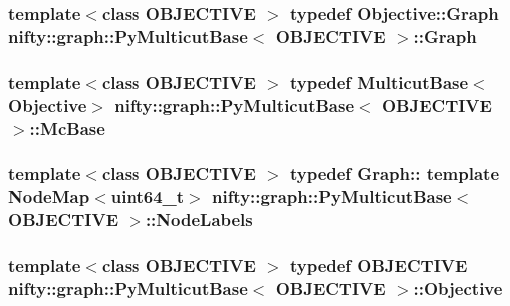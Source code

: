 \subsubsection[{Graph}]{\setlength{\rightskip}{0pt plus 5cm}template$<$class O\+B\+J\+E\+C\+T\+I\+V\+E $>$ typedef Objective\+::\+Graph {\bf nifty\+::graph\+::\+Py\+Multicut\+Base}$<$ O\+B\+J\+E\+C\+T\+I\+V\+E $>$\+::{\bf Graph}}\label{classnifty_1_1graph_1_1PyMulticutBase_adcef0a06c28d00ad248e6118b96c3630}
\hypertarget{classnifty_1_1graph_1_1PyMulticutBase_a687613abe29ca84ad5dc24e7bb072b83}{}
\subsubsection[{Mc\+Base}]{\setlength{\rightskip}{0pt plus 5cm}template$<$class O\+B\+J\+E\+C\+T\+I\+V\+E $>$ typedef {\bf Multicut\+Base}$<${\bf Objective}$>$ {\bf nifty\+::graph\+::\+Py\+Multicut\+Base}$<$ O\+B\+J\+E\+C\+T\+I\+V\+E $>$\+::{\bf Mc\+Base}}\label{classnifty_1_1graph_1_1PyMulticutBase_a687613abe29ca84ad5dc24e7bb072b83}
\hypertarget{classnifty_1_1graph_1_1PyMulticutBase_af4707ea886ac9eefe9f755a4977a4eb0}{}
\subsubsection[{Node\+Labels}]{\setlength{\rightskip}{0pt plus 5cm}template$<$class O\+B\+J\+E\+C\+T\+I\+V\+E $>$ typedef Graph\+:: template Node\+Map$<$uint64\+\_\+t$>$ {\bf nifty\+::graph\+::\+Py\+Multicut\+Base}$<$ O\+B\+J\+E\+C\+T\+I\+V\+E $>$\+::{\bf Node\+Labels}}\label{classnifty_1_1graph_1_1PyMulticutBase_af4707ea886ac9eefe9f755a4977a4eb0}
\hypertarget{classnifty_1_1graph_1_1PyMulticutBase_ab2111d845c2163c0a7a4d9cccbe18458}{}
\subsubsection[{Objective}]{\setlength{\rightskip}{0pt plus 5cm}template$<$class O\+B\+J\+E\+C\+T\+I\+V\+E $>$ typedef O\+B\+J\+E\+C\+T\+I\+V\+E {\bf nifty\+::graph\+::\+Py\+Multicut\+Base}$<$ O\+B\+J\+E\+C\+T\+I\+V\+E $>$\+::{\bf Objective}}\label{classnifty_1_1graph_1_1PyMulticutBase_ab2111d845c2163c0a7a4d9cccbe18458}
\hypertarget{classnifty_1_1graph_1_1PyMulticutBase_ab8e429d9af32f127a62a886c523600e4}{}
